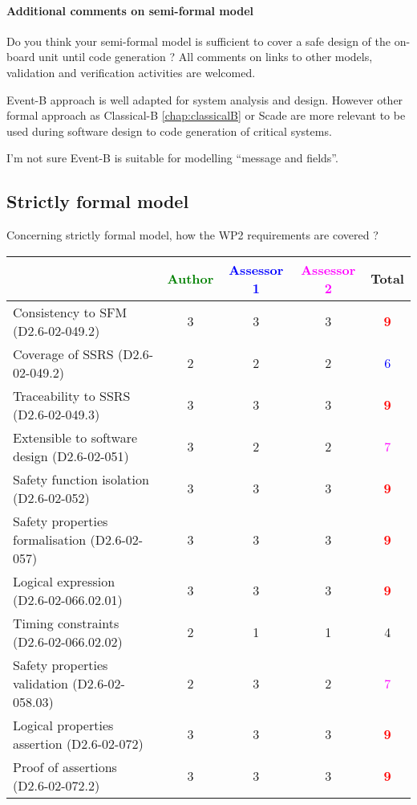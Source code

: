 \paragraph{Additional comments on semi-formal  model} Do you think your semi-formal  model is sufficient to cover a safe design of the on-board unit until code generation ?
All comments on links to  other models, validation and verification activities are welcomed.


\begin{author_comment}
Event-B  approach is well adapted for system analysis and design. However other formal approach as Classical-B \ref{chap:classicalB} or Scade are more relevant to be used during software design to code generation of critical systems.
\end{author_comment}


\begin{assessor1}
I'm not sure Event-B is suitable for modelling ``message and fields''.
\end{assessor1}


\subsection{Strictly formal model}

Concerning strictly formal model, how the WP2 requirements are covered ?

\begin{tabular}{|l | c | c | c | c|}
\hline
& \textcolor{green}{Author} & \textcolor{blue}{Assessor 1} & \textcolor{magenta}{Assessor 2} & Total \\
\hline 
Consistency to SFM (D2.6-02-049.2) & 3    & 3    & 3    & \textcolor{red}{\textbf{9}} \\
\hline
Coverage of SSRS (D2.6-02-049.2)  & 2    & 2    & 2    & \textcolor{blue}{6} \\
\hline
Traceability to  SSRS (D2.6-02-049.3)  & 3    & 3    & 3    & \textcolor{red}{\textbf{9}} \\
\hline
Extensible to software design (D2.6-02-051)  & 3    & 2    & 2    & \textcolor{magenta}{7} \\
\hline
Safety function isolation (D2.6-02-052)  & 3    & 3    & 3    & \textcolor{red}{\textbf{9}} \\
\hline 
Safety properties formalisation (D2.6-02-057)  & 3    & 3    & 3    & \textcolor{red}{\textbf{9}} \\
\hline
Logical expression (D2.6-02-066.02.01)  & 3    & 3    & 3    & \textcolor{red}{\textbf{9}} \\
\hline
Timing constraints (D2.6-02-066.02.02)  & 2    & 1    & 1    & 4    \\
\hline
Safety properties validation (D2.6-02-058.03)  & 2    & 3    & 2    & \textcolor{magenta}{7} \\
\hline
Logical properties assertion (D2.6-02-072)  & 3    & 3    & 3    & \textcolor{red}{\textbf{9}} \\
\hline
Proof of assertions (D2.6-02-072.2)  & 3    & 3    & 3    & \textcolor{red}{\textbf{9}} \\
\hline
\end{tabular}

